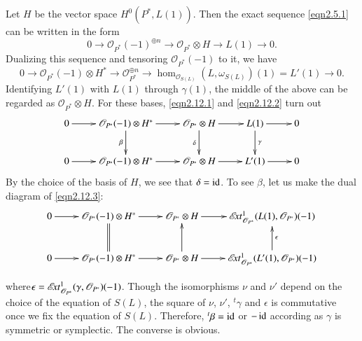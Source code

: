 \begin{Proof}
Let $H$ be the vector space $H^{0}(P^{\ast}, L(1))$. Then the exact
sequence \eqref{eqn2.5.1} can be written in the form 
\setcounter{equation}{0}
\begin{equation}\label{eqn2.12.1}
0\to \mathscr{O}_{P^{\ast}}(-1)^{\oplus n}\to
\mathscr{O}_{P^{\ast}}\otimes H\to L(1)\to 0.
\end{equation}
Dualizing this sequence and tensoring $\mathscr{O}_{P^{\ast}}(-1)$ to
it, we have 
\begin{equation}\label{eqn2.12.2}
0\to \mathscr{O}_{P^{\ast}}(-1)\otimes H^{\ast}\to \mathscr{O}^{\oplus
  n}_{P^{\ast}}\to \hom_{\mathscr{O}_{S(L)}}(L,
\omega_{S(L)})(1)=L'(1)\to 0.
\end{equation}
Identifying $L'(1)$ with $L(1)$ through $\gamma(1)$, the middle of the
above can be regarded as $\mathscr{O}_{P^{\ast}}\otimes H$. For these
bases, \eqref{eqn2.12.1} and \eqref{eqn2.12.2} turn out 
\begin{equation}\label{eqn2.12.3}
\vcenter{
\xymatrix{0\ar[r]&\mathscr{O}_{P^{\ast}}(-1)\otimes
  H^{\ast}\ar[d]_{\beta}\ar[r]&\mathscr{O}_{P^{\ast}}\otimes H\ar[d]_{\delta}\ar[r]& L(1)\ar[d]^{\gamma}\ar[r]&0\\
0\ar[r]&\mathscr{O}_{P^{\ast}}(-1)\otimes
H^{\ast}\ar[r]&\mathscr{O}_{P^{\ast}}\otimes H\ar[r]&L'(1)\ar[r]&0}}
\end{equation}
By the choice of the basis of $H$, we see that $\delta=\operatorname{id}$. To see
$\beta$, let us make the dual diagram of \eqref{eqn2.12.3}:
$$
\xymatrix{0\ar[r]&\mathscr{O}_{P^{\ast}}(-1)\otimes
  H^{\ast}\ar@{=}[d]\ar[r]&\mathscr{O}_{P^{\ast}}\otimes H\ar[r]&
  \ext^{1}_{\mathscr{O}_{P^{\ast}}}(L(1),\mathscr{O}_{P^{\ast}})(-1)\\
  0\ar[r]&\mathscr{O}_{P^{\ast}}(-1)\otimes
  H^{\ast}\ar[r]&\mathscr{O}_{P^{\ast}}\otimes H\ar[u]\ar[r]&
  \ext^{1}_{\mathscr{O}_{P^{\ast}}}(L'(1),\mathscr{O}_{P^{\ast}})(-1)\ar[u]_{\epsilon}}
$$

\noindent
where\pageoriginale $\epsilon=\mathscr{E}\!{\it xt}^{1}_{\mathscr{O}_{P^{\ast}}}(\gamma,\mathscr{O}_{P^{\ast}})(-1)$. Though
the isomorphisms $\nu$ and $\nu'$ depend on the choice of the equation
of $S(L)$, the square of $\nu$, $\nu'$, ${}^t\gamma$ and $\epsilon$ is
commutative once we fix the equation of $S(L)$. Therefore,
${}^t\beta=\operatorname{id}$ or $-\operatorname{id}$ according as $\gamma$ is symmetric or
symplectic. The converse is obvious.
\enprf
\end{Proof}

